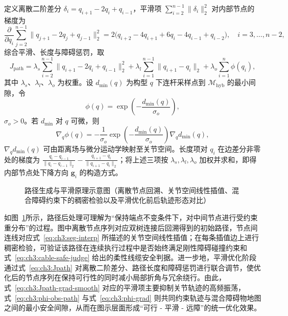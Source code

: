 定义离散二阶差分 $\delta_i=q_{i+1}-2q_i+q_{i-1}$，平滑项 $\sum_{i=2}^{n-1}\|\delta_i\|_2^2$ 对内部节点的梯度为
\begin{equation}
  \frac{\partial}{\partial q_i}\sum_{j=2}^{n-1}\bigl\|q_{j+1}-2q_j+q_{j-1}\bigr\|_2^2
  =2\bigl(q_{i+2}-4q_{i+1}+6q_i-4q_{i-1}+q_{i-2}\bigr),
  \quad i=3,\ldots,n-2,
  \label{eq:ch3:Jpath-grad-smooth}
\end{equation}
综合平滑、长度与障碍惩罚，取
\begin{equation}
  J_{\mathrm{path}}=
  \lambda_s\sum_{i=2}^{n-1}\bigl\|q_{i+1}-2q_i+q_{i-1}\bigr\|_2^2
  +\lambda_l\sum_{i=1}^{n-1}\bigl\|q_{i+1}-q_i\bigr\|_2
  +\lambda_o\sum_{i=1}^{n}\phi(q_i),
  \label{eq:ch3:Jpath}
\end{equation}
其中 $\lambda_s$、$\lambda_l$、$\lambda_o$ 为权重。设 $d_{\min}(q)$ 为构型 $q$ 下连杆采样点到 $\mathcal{M}_{\mathrm{hyb}}$ 的最小间隙，令
\begin{equation}
  \phi(q)=\exp\!\left(-\frac{d_{\min}(q)}{\sigma_o}\right),
  \label{eq:ch3:phi-obs-path}
\end{equation}
$\sigma_o>0$。若 $d_{\min}$ 对 $q$ 可微，则
\begin{equation}
  \nabla_q \phi(q)=-\frac{1}{\sigma_o}\exp\!\left(-\frac{d_{\min}(q)}{\sigma_o}\right)\nabla_q d_{\min}(q),
  \label{eq:ch3:phi-grad}
\end{equation}
$\nabla_q d_{\min}(q)$ 可由距离场与微分运动学映射至关节空间。长度项对 $q_i$ 在边差分非零处的梯度为 $\frac{q_i-q_{i-1}}{\|q_i-q_{i-1}\|_2}-\frac{q_{i+1}-q_i}{\|q_{i+1}-q_i\|_2}$；将上述三项按 $\lambda_s,\lambda_l,\lambda_o$ 加权并求和，即得内部节点处下降方向 $\mathbf{g}_i$ 的构造方式。

\begin{figure}[htbp]
  \centering
  \caption{路径生成与平滑原理示意图（离散节点回溯、关节空间线性插值、混合障碍约束下的稠密检验以及平滑优化前后轨迹形态对比）}
  \label{fig:ch3:path-smooth-principle}
\end{figure}

如图~\ref{fig:ch3:path-smooth-principle}所示，路径后处理可理解为“保持端点不变条件下，对中间节点进行受约束重分布”的过程。图中离散节点序列对应双树连接后回溯得到的初始路径，节点间连线对应式~\eqref{eq:ch3:seg-interp} 所描述的关节空间线性插值；在每条插值边上进行稠密检验，可验证该路径在连续执行过程中是否始终满足刚性障碍碰撞约束和式~\eqref{eq:ch3:cable-safe-judge} 给出的柔性线缆安全判据。进一步地，平滑优化阶段通过式~\eqref{eq:ch3:Jpath} 对离散二阶差分、路径长度和障碍惩罚进行联合调节，使优化后的节点序列在保持可行性的同时减小局部折角与冗余绕行。由此，式~\eqref{eq:ch3:Jpath-grad-smooth} 对应的平滑项主要抑制关节轨迹的高频振荡，式~\eqref{eq:ch3:phi-obs-path} 与式~\eqref{eq:ch3:phi-grad} 则共同约束轨迹与混合障碍物地图之间的最小安全间隙，从而在图示层面形成“可行 - 平滑 - 远障”的统一优化效果。

